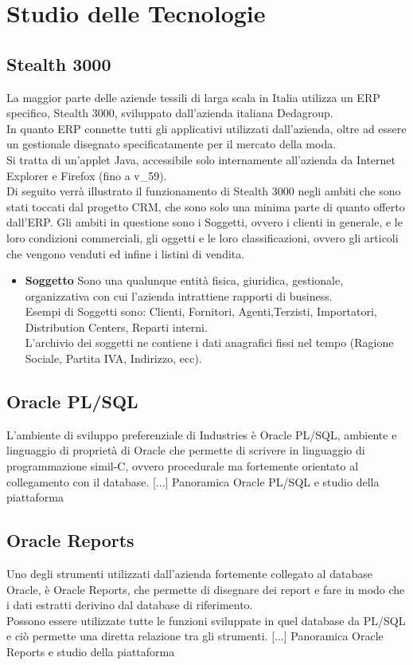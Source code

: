 \section{Studio delle Tecnologie}
\subsection{Stealth 3000}
La maggior parte delle aziende tessili di larga scala in Italia utilizza un ERP specifico, Stealth 3000, sviluppato dall'azienda italiana Dedagroup.\\
In quanto ERP connette tutti gli applicativi utilizzati dall'azienda, oltre ad essere un gestionale disegnato specificatamente per il mercato della moda. \\
Si tratta di un'applet Java, accessibile solo internamente all'azienda da Internet Explorer e Firefox (fino a v_59).\\
Di seguito verrà illustrato il funzionamento di Stealth 3000 negli ambiti che sono stati toccati dal progetto CRM, che sono solo una minima parte di quanto offerto dall'ERP. Gli ambiti in questione sono i Soggetti, ovvero i clienti in generale, e le loro condizioni commerciali, gli oggetti e le loro classificazioni, ovvero gli articoli che vengono venduti ed infine i listini di vendita.\\
\begin{itemize}
\item \textbf{Soggetto}
Sono una qualunque entità fisica, giuridica, gestionale, organizzativa con cui l'azienda intrattiene rapporti di business.\\
Esempi di Soggetti sono: Clienti, Fornitori, Agenti,Terzisti, Importatori, Distribution Centers, Reparti interni.\\
L'archivio dei soggetti ne contiene i dati anagrafici fissi nel tempo (Ragione Sociale, Partita IVA, Indirizzo, ecc).

\end{itemize}

\subsection{Oracle PL/SQL}
L'ambiente di sviluppo preferenziale di Industries è Oracle PL/SQL, ambiente e linguaggio di proprietà di Oracle che permette di scrivere in linguaggio di programmazione simil-C, ovvero procedurale ma fortemente orientato al collegamento con il database.
[...] Panoramica Oracle PL/SQL e studio della piattaforma

\subsection{Oracle Reports}
Uno degli strumenti utilizzati dall'azienda fortemente collegato al database Oracle, è Oracle Reports, che permette di disegnare dei report e fare in modo che i dati estratti derivino dal database di riferimento.\\
Possono essere utilizzate tutte le funzioni sviluppate in quel database da PL/SQL e ciò permette una diretta relazione tra gli strumenti.
[...] Panoramica Oracle Reports e studio della piattaforma

